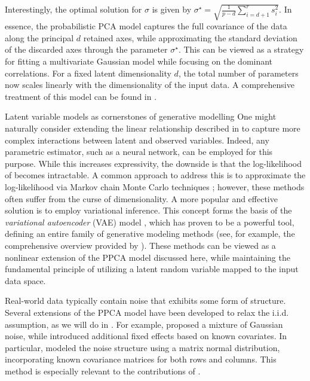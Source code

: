 Interestingly, the optimal solution for $\sigma$ is given by $\sigma^\star = \sqrt{\frac{1}{p-d} \sum_{i=d+1}^{r} s^2_i}$. In essence, the probabilistic PCA model captures the full covariance of the data along the principal $d$ retained axes, while approximating the standard deviation of the discarded axes through the parameter $\sigma^\star$. This can be viewed as a strategy for fitting a multivariate Gaussian model while focusing on the dominant correlations. For a fixed latent dimensionality $d$, the total number of parameters now scales linearly with the dimensionality of the input data. A comprehensive treatment of this model can be found in \citep{bishop2006pattern}.

\begin{mem1}{Latent variable models as cornerstones of generative modelling}
    One might naturally consider extending the linear relationship described in  to capture more complex interactions between latent and observed variables. Indeed, any parametric estimator, such as a neural network, can be employed for this purpose. While this increases expressivity, the downside is that the log-likelihood of  becomes intractable. A common approach to address this is to approximate the log-likelihood via Markov chain Monte Carlo techniques \citep{andrieu2003introduction}; however, these methods often suffer from the curse of dimensionality. A more popular and effective solution is to employ variational inference. This concept forms the basis of the \emph{variational autoencoder} (VAE) model \citep{kingma2013auto}, which has proven to be a powerful tool, defining an entire family of generative modeling methods (see, for example, the comprehensive overview provided by \cite{tomczak2021latent}). These methods can be viewed as a nonlinear extension of the PPCA model discussed here, while maintaining the fundamental principle of utilizing a latent random variable mapped to the input data space.
\end{mem1}

\begin{remark}
    Real-world data typically contain noise that exhibits some form of structure. Several extensions of the PPCA model have been developed to relax the i.i.d. assumption, as we will do in . For example, \cite{zhao2014robust} proposed a mixture of Gaussian noise, while \cite{kalaitzis2011residual} introduced additional fixed effects based on known covariates. In particular, \cite{allen2014generalized} modeled the noise structure using a matrix normal distribution, incorporating known covariance matrices for both rows and columns. This method is especially relevant to the contributions of .
\end{remark}


